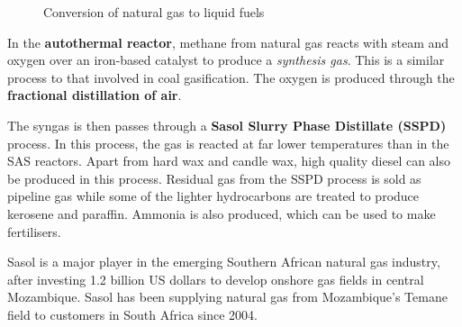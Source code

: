 \begin{enumerate}
{\begin{center}
\begin{figure}[h]
\caption{Conversion of natural gas to liquid fuels}
\label{fig:Sasol:gas to fuel}
\end{figure}
\end{center}
}

In the \textbf{autothermal reactor}, methane from natural gas reacts with steam and oxygen over an iron-based catalyst to produce a \textit{synthesis gas}. This is a similar process to that involved in coal gasification. The oxygen is produced through the \textbf{fractional distillation of air}. 


The syngas is then passes through a \textbf{Sasol Slurry Phase Distillate (SSPD)} process. In this process, the gas is reacted at far lower temperatures than in the SAS reactors. Apart from hard wax and candle wax, high quality diesel can also be produced in this process. Residual gas from the SSPD process is sold as pipeline gas while some of the lighter hydrocarbons are treated to produce kerosene and paraffin. Ammonia is also produced, which can be used to make fertilisers.
\end{enumerate}

\begin{IFact}{Sasol is a major player in the emerging Southern African natural gas industry, after investing 1.2 billion US dollars to develop onshore gas fields in central Mozambique. Sasol has been supplying natural gas from Mozambique's Temane field to customers in South Africa since 2004.}
\end{IFact}

